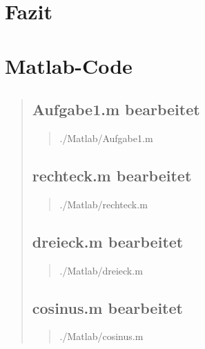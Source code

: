 \section{Fazit}
\begin{quote}
     
\end{quote}

\section{Matlab-Code}
\begin{quote}
    \subsection{Aufgabe1.m bearbeitet}
    \begin{quote}
            
            {./Matlab/Aufgabe1.m}
    \end{quote}
    \subsection{rechteck.m bearbeitet}
    \begin{quote}
            
            {./Matlab/rechteck.m}
    \end{quote}
    \subsection{dreieck.m bearbeitet}
    \begin{quote}
            
            {./Matlab/dreieck.m}        
    \end{quote}
    \subsection{cosinus.m bearbeitet}
    \begin{quote}
            
            {./Matlab/cosinus.m}        
    \end{quote}                 	
\end{quote}


